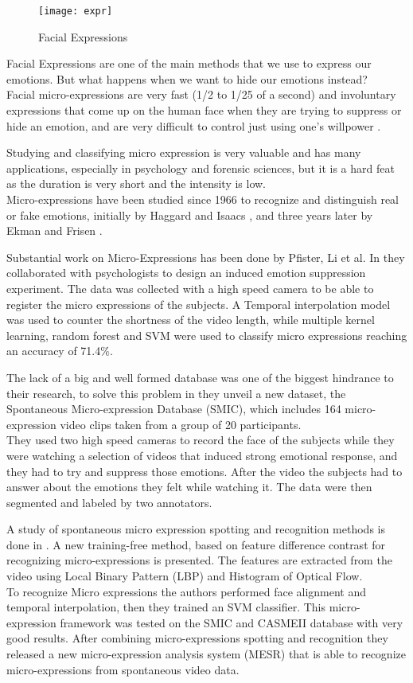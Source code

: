 \begin{figure}[H]
	\centering
	\texttt{[image: expr]}
	\caption{Facial Expressions}
\end{figure}

Facial Expressions are one of the main methods that we use to express our emotions. But what happens when we want to hide our emotions instead? \\
Facial micro-expressions are very fast (1/2 to 1/25 of a second) and involuntary expressions that come up on the human face when they are trying to suppress or hide an emotion, and are very difficult to control just using one's willpower \cite{EkmanER}.

Studying and classifying micro expression is very valuable and has many applications, especially in psychology and forensic sciences, but it is a hard feat as the duration is very short and the intensity is low.\\ 
Micro-expressions have been studied since 1966 to recognize and distinguish real or fake emotions, initially by Haggard and Isaacs \cite{Haggard}, and three years later by Ekman and Frisen \cite{EkmanLeakage}.

Substantial work on Micro-Expressions has been done by Pfister, Li et al. In \cite{pfister2011micro} they collaborated with psychologists to design an induced emotion suppression experiment. The data was collected with a high speed camera to be able to register the micro expressions of the subjects. A Temporal interpolation model was used to counter the shortness of the video length, while multiple kernel learning, random forest and SVM were used to classify micro expressions reaching an accuracy of 71.4\%.

The lack of a big and well formed database was one of the biggest hindrance to their research, to solve this problem in \cite{xli2012spontaneous} they unveil a new dataset, the Spontaneous Micro-expression Database (SMIC), which includes 164 micro-expression video clips taken from a group of 20 participants.\\
They used two high speed cameras to record the face of the subjects while they were watching a selection of videos that induced strong emotional response, and they had to try and suppress those emotions. After the video the subjects had to answer about the emotions they felt while watching it. The data were then segmented and labeled by two annotators.

A study of spontaneous micro expression spotting and recognition methods is done in \cite{xli2015reading}. A new training-free method, based on feature difference contrast for recognizing micro-expressions is presented. The features are extracted from the video using Local Binary Pattern (LBP) and Histogram of Optical Flow. \\
To recognize Micro expressions the authors performed face alignment and temporal interpolation, then they trained an SVM classifier. This micro-expression framework was tested on the SMIC and CASMEII database with very good results. After combining micro-expressions spotting and recognition they released a new micro-expression analysis system (MESR) that is able to recognize micro-expressions from spontaneous video data.


